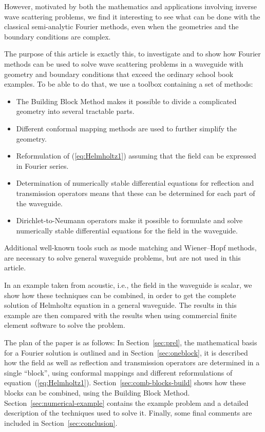 \documentclass{kluwer}
\begin{document}
\begin{article}
However, motivated by both the mathematics and applications involving
inverse wave scattering problems, we find it interesting to see what
can be done with the classical semi-analytic Fourier methods, even
when the geometries and the boundary conditions are complex.

The purpose of this article is exactly this, to investigate and to
show how Fourier methods can be used to solve wave scattering problems
in a waveguide with geometry and boundary conditions that exceed the
ordinary school book examples. To be able to do that, we use a toolbox
containing a set of methods:
\begin{itemize}
\item The Building Block Method makes it possible to divide a
  complicated geometry into several tractable parts.
\item Different conformal mapping methods are used to further simplify
  the geometry.
\item Reformulation of (\ref{eq:Helmholtz1}) assuming that the field
  can be expressed in Fourier series.
\item Determination of numerically stable differential equations for
  reflection and transmission operators means that these can be
  determined for each part of the waveguide.
\item Dirichlet-to-Neumann operators make it possible to formulate and
  solve numerically stable differential equations for the field in the
  waveguide.
\end{itemize}

Additional well-known tools such as mode matching and Wiener--Hopf
methods, are necessary to solve general waveguide problems, but are
not used in this article.

In an example taken from acoustic, i.e., the field in the waveguide
is scalar, we show how these techniques can be combined, in order to
get the complete solution of Helmholtz equation in a general
waveguide. The results in this example are then compared with the
results when using commercial finite element software to solve the
problem.

The plan of the paper is as follows: In Section~\ref{sec:prel}, the
mathematical basis for a Fourier solution is outlined and in
Section~\ref{sec:oneblock}, it is described how the field as well as
reflection and transmission operators are determined in a single
``block'', using conformal mappings and different reformulations of
equation~(\ref{eq:Helmholtz1}).  Section~\ref{sec:comb-blocks-build}
shows how these blocks can be combined, using the Building Block
Method. Section~\ref{sec:numerical-example} contains the example
problem and a detailed description of the techniques used to solve
it. Finally, some final comments are included in
Section~\ref{sec:conclusion}.


\end{article}
\end{document}
